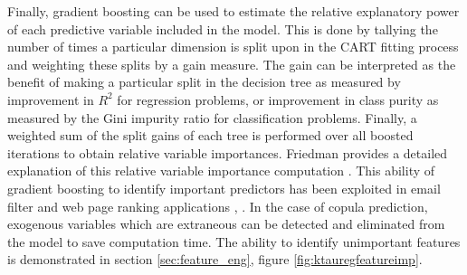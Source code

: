 Finally, gradient boosting can be used to estimate the relative explanatory power of each predictive variable included in the model.  This is done by tallying the number of times a particular dimension is split upon in the CART fitting process and weighting these splits by a gain measure.  The gain can be interpreted as the benefit of making a particular split in the decision tree as measured by improvement in $R^2$ for regression problems, or improvement in class purity as measured by the Gini impurity ratio for classification problems.  Finally, a weighted sum of the split gains of each tree is performed over all boosted iterations to obtain relative variable importances. Friedman provides a detailed explanation of this relative variable importance computation \cite{friedman2001}.  This ability of gradient boosting to identify important predictors has been exploited in email filter and web page ranking applications \cite{chapelle2011}, \cite{Tyree2011}.  In the case of copula prediction, exogenous variables which are extraneous can be detected and eliminated from the model to save computation time.  The ability to identify unimportant features is demonstrated in section \ref{sec:feature_eng}, figure \ref{fig:ktauregfeatureimp}.
